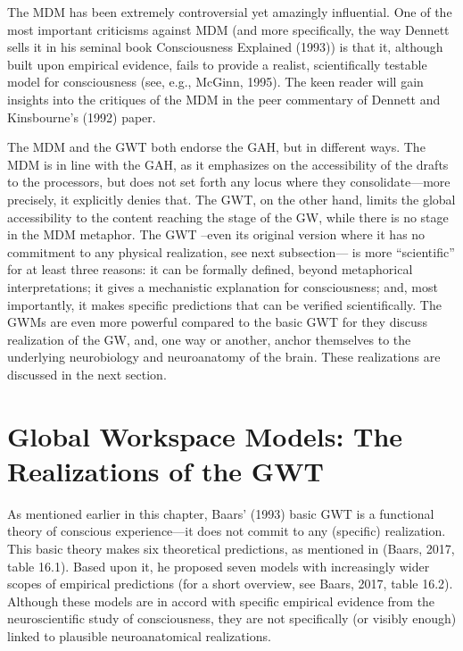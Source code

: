 \documentclass[12pt,twoside]{reedthesis}
\begin{document}
The MDM has been extremely controversial yet amazingly influential. One of the most important criticisms against MDM (and more specifically, the way Dennett sells it in his seminal book Consciousness Explained (1993)) is that it, although built upon empirical evidence, fails to provide a realist, scientifically testable model for consciousness (see, e.g., McGinn, 1995). The keen reader will gain insights into the critiques of the MDM in the peer commentary of Dennett and Kinsbourne's (1992) paper.

The MDM and the GWT both endorse the GAH, but in different ways. The MDM is in line with the GAH, as it emphasizes on the accessibility of the drafts to the processors, but does not set forth any locus where they consolidate---more precisely, it explicitly denies that. The GWT, on the other hand, limits the global accessibility to the content reaching the stage of the GW, while there is no stage in the MDM metaphor. The GWT --even its original version where it has no commitment to any physical realization, see next subsection--- is more ``scientific'' for at least three reasons: it can be formally defined, beyond metaphorical interpretations; it gives a mechanistic explanation for consciousness; and, most importantly, it makes specific predictions that can be verified scientifically. The GWMs are even more powerful compared to the basic GWT for they discuss realization of the GW, and, one way or another, anchor themselves to the underlying neurobiology and neuroanatomy of the brain. These realizations are discussed in the next section.

\hypertarget{global-workspace-models-the-realizations-of-the-gwt}{%
\section{Global Workspace Models: The Realizations of the GWT}\label{global-workspace-models-the-realizations-of-the-gwt}}

As mentioned earlier in this chapter, Baars' (1993) basic GWT is a functional theory of conscious experience---it does not commit to any (specific) realization. This basic theory makes six theoretical predictions, as mentioned in (Baars, 2017, table 16.1). Based upon it, he proposed seven models with increasingly wider scopes of empirical predictions (for a short overview, see Baars, 2017, table 16.2). Although these models are in accord with specific empirical evidence from the neuroscientific study of consciousness, they are not specifically (or visibly enough) linked to plausible neuroanatomical realizations.
\end{document}
